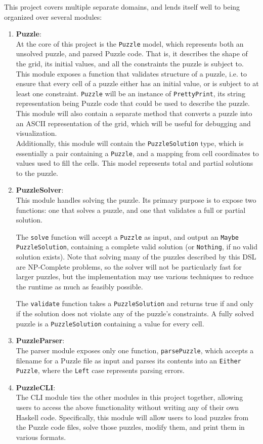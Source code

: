 \documentclass[
]{article}
\begin{document}
	This project covers multiple separate domains, and lends itself well to being organized over several modules:\begin{enumerate}
		\item \textbf{Puzzle}:\\
		At the core of this project is the \texttt{Puzzle} model, which represents both an unsolved puzzle, and parsed Puzzle code. That is, it describes the shape of the grid, its initial values, and all the constraints the puzzle is subject to. This module exposes a function that validates structure of a puzzle, i.e. to ensure that every cell of a puzzle either has an initial value, or is subject to at least one constraint. \texttt{Puzzle} will be an instance of \texttt{PrettyPrint}, its string representation being Puzzle code that could be used to describe the puzzle. This module will also contain a separate method that converts a puzzle into an ASCII representation of the grid, which will be useful for debugging and visualization.\\
		Additionally, this module will contain the \texttt{PuzzleSolution} type, which is essentially a pair containing a \texttt{Puzzle}, and a mapping from cell coordinates to values used to fill the cells. This model represents total and partial solutions to the puzzle.
		\item \textbf{PuzzleSolver}:\\
		This module handles solving the puzzle. Its primary purpose is to expose two functions: one that solves a puzzle, and one that validates a full or partial solution.
		
		The \texttt{solve} function will accept a \texttt{Puzzle} as input, and output an \texttt{Maybe PuzzleSolution}, containing a complete valid solution (or \texttt{Nothing}, if no valid solution exists). Note that solving many of the puzzles described by this DSL are NP-Complete problems, so the solver will not be particularly fast for larger puzzles, but the implementation may use various techniques to reduce the runtime as much as feasibly possible.
		
		The \texttt{validate} function takes a \texttt{PuzzleSolution} and returns true if and only if the solution does not violate any of the puzzle's constraints. A fully solved puzzle is a \texttt{PuzzleSolution} containing a value for every cell.
		
		\item \textbf{PuzzleParser}:\\
		The parser module exposes only one function, \texttt{parsePuzzle}, which accepts a filename for a Puzzle file as input and parses its contents into an \texttt{Either Puzzle}, where the \texttt{Left} case represents parsing errors.
		
		\item \textbf{PuzzleCLI}:\\
		The CLI module ties the other modules in this project together, allowing users to access the above functionality without writing any of their own Haskell code. Specifically, this module will allow users to load puzzles from the Puzzle code files, solve those puzzles, modify them, and print them in various formats.
	\end{enumerate}
	
\end{document}
